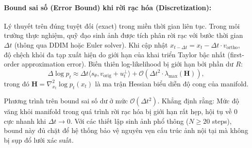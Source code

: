 \documentclass[runningheads]{llncs}
\begin{document}
\paragraph{Bound sai số (Error Bound) khi rời rạc hóa (Discretization):}
Lý thuyết trên đúng tuyệt đối (exact) trong miền thời gian liên tục. Trong môi trường thực nghiệm, quỹ đạo sinh ảnh được tích phân rời rạc với bước thời gian $\Delta t$ (thông qua DDIM hoặc Euler solver). Khi cập nhật $x_{t-\Delta t} = x_t - \Delta t \cdot v_{\text{ortho}}$, độ chệch khỏi đa tạp xuất hiện do giới hạn của khai triển Taylor bậc nhất (first-order approximation error).
Biến thiên log-likelihood bị giới hạn bởi phần dư $R$:
\begin{equation}
    \Delta \log p_t \approx \Delta t \langle s_\theta, v_{\text{orig}} + u_t^\perp \rangle + \mathcal{O}(\Delta t^2 \cdot \lambda_{\max}(\mathbf{H})),
\end{equation}
trong đó $\mathbf{H} = \nabla_{x_t}^2 \log p_t(x_t)$ là ma trận Hessian biểu diễn độ cong của manifold. 

Phương trình trên bound sai số dư ở mức $\mathcal{O}(\Delta t^2)$. Khẳng định rằng: Mức độ văng khỏi manifold trong quá trình rời rạc hóa bị giới hạn rất hẹp, hội tụ về 0 cực nhanh khi $\Delta t \to 0$. Với các thiết lập sinh ảnh phổ thông ($N \ge 20$ steps), bound này đủ chặt để hệ thống bảo vệ nguyên vẹn cấu trúc ảnh nội tại mà không bị sụp đổ lưới xác suất.
\end{document}
